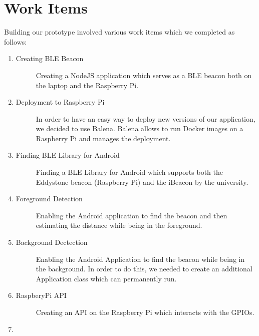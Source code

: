 \documentclass[
10pt, %
a4paper, %
oneside, %
headinclude,footinclude, %
BCOR5mm, %
]{scrartcl}
\begin{document}
\section{Work Items}
Building our prototype involved various work items which we completed as follows:
\begin{enumerate}
\item 
	\begin{description}
	\item[Creating BLE Beacon] Creating a NodeJS application which serves as a BLE beacon both on the laptop and the Raspberry Pi.
	\end{description}
\item 
	\begin{description}
	\item[Deployment to Raspberry Pi] In order to have an easy way to deploy new versions of our application, we decided to use Balena. Balena allows to run Docker images on a Raspberry Pi and manages the deployment.
	\end{description}
	\item 
	\begin{description}
		\item[Finding BLE Library for Android] Finding a BLE Library for Android which supports both the Eddystone beacon (Raspberry Pi) and the iBeacon by the university.
	\end{description}
	\item 
	\begin{description}
		\item[Foreground Detection] Enabling the Android application to find the beacon and then estimating the distance while being in the foreground.
	\end{description}
	\item 
	\begin{description}
		\item[Background Dectection] Enabling the Android Application to find the beacon while being in the background. In order to do this, we needed to create an additional Application class which can permanently run.
	\end{description}
	\item 
		\begin{description}
		\item[RaspberyPi API] Creating an API on the Raspberry Pi which interacts with the GPIOs.
	\end{description}
	\item 
		\begin{description}

\end{description}
\end{enumerate}
\end{document}
